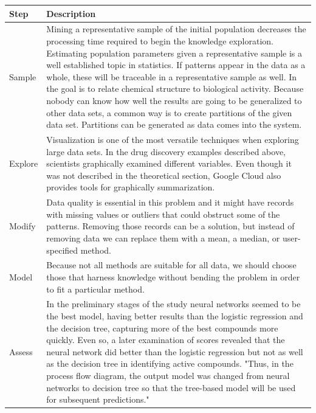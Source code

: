 \begin{table}[ht!]
  \begin{center}
    \label{tab:table5}
    {\begin{tabular}{p{2cm} p{12cm}}
        \textbf{Step} & \textbf{Description} \vspace{2mm} \\
        \hline
         Sample & Mining a representative sample of the initial population decreases the processing time required to begin the knowledge exploration. Estimating population parameters given a representative sample is a well established topic in statistics. If patterns appear in the data as a whole, these will be traceable in a representative sample as well. In \cite{hoho} the goal is to relate chemical structure to biological activity. Because nobody can know how well the results are going to be generalized to other data sets, a common way is to create partitions of the given data set. Partitions can be generated as data comes into the system. \vspace{2mm} \\
         Explore & Visualization is one of the most versatile techniques when exploring large data sets. In the drug discovery examples described above, scientists graphically examined different variables. Even though it was not described in the theoretical section, Google Cloud also provides tools for graphically summarization. \vspace{2mm}\\
         Modify & Data quality is essential in this problem and it might have records with missing values or outliers that could obstruct some of the patterns. Removing those records can be a solution, but instead of removing data we can replace them with a mean, a median, or user-specified method.\vspace{2mm} \\
         Model & Because not all methods are suitable for all data, we should choose those that harness knowledge without bending the problem in order to fit a particular method. \vspace{2mm}\\
         Assess & In the preliminary stages of the study neural networks seemed to be the best model, having better results than the logistic regression and the decision tree, capturing more of the best compounds more quickly. Even so, a later examination of scores revealed that the neural network did better than the logistic regression but not as well as the decision tree in identifying active compounds. "Thus, in the process flow diagram, the output model was changed from neural networks to decision tree so that the tree-based model will be used for subsequent predictions." \cite{hoho} \\
         
    \end{tabular}}
  \end{center}
\end{table}

